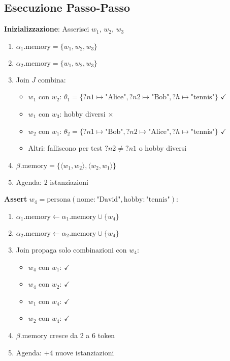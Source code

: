 \subsection{Esecuzione Passo-Passo}

\textbf{Inizializzazione}: Asserisci $w_1$, $w_2$, $w_3$

\begin{enumerate}
\item $\alpha_1.\text{memory} = \{w_1, w_2, w_3\}$
\item $\alpha_2.\text{memory} = \{w_1, w_2, w_3\}$
\item Join $J$ combina:
   \begin{itemize}
   \item $w_1$ con $w_2$: $\theta_1 = \{?n1 \mapsto \text{"Alice"}, ?n2 \mapsto \text{"Bob"}, ?h \mapsto \text{"tennis"}\}$ $\checkmark$
   \item $w_1$ con $w_3$: hobby diversi $\times$
   \item $w_2$ con $w_1$: $\theta_2 = \{?n1 \mapsto \text{"Bob"}, ?n2 \mapsto \text{"Alice"}, ?h \mapsto \text{"tennis"}\}$ $\checkmark$
   \item Altri: falliscono per test $?n2 \neq ?n1$ o hobby diversi
   \end{itemize}
\item $\beta.\text{memory} = \{\langle w_1, w_2 \rangle, \langle w_2, w_1 \rangle\}$
\item Agenda: 2 istanziazioni
\end{enumerate}

\textbf{Assert} $w_4 = \text{persona}(\text{nome}: \text{"David"}, \text{hobby}: \text{"tennis"})$:

\begin{enumerate}
\item $\alpha_1.\text{memory} \gets \alpha_1.\text{memory} \cup \{w_4\}$
\item $\alpha_2.\text{memory} \gets \alpha_2.\text{memory} \cup \{w_4\}$
\item Join propaga solo combinazioni con $w_4$:
   \begin{itemize}
   \item $w_4$ con $w_1$: $\checkmark$
   \item $w_4$ con $w_2$: $\checkmark$
   \item $w_1$ con $w_4$: $\checkmark$
   \item $w_2$ con $w_4$: $\checkmark$
   \end{itemize}
\item $\beta.\text{memory}$ cresce da 2 a 6 token
\item Agenda: +4 nuove istanziazioni
\end{enumerate}

